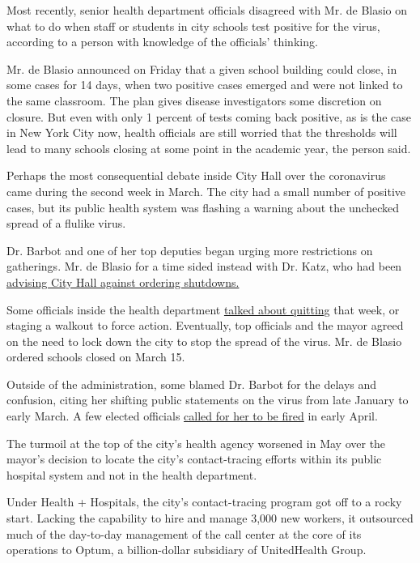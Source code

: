 Most recently, senior health department officials disagreed with Mr. de
Blasio on what to do when staff or students in city schools test
positive for the virus, according to a person with knowledge of the
officials' thinking.

Mr. de Blasio announced on Friday that a given school building could
close, in some cases for 14 days, when two positive cases emerged and
were not linked to the same classroom. The plan gives disease
investigators some discretion on closure. But even with only 1 percent
of tests coming back positive, as is the case in New York City now,
health officials are still worried that the thresholds will lead to many
schools closing at some point in the academic year, the person said.

Perhaps the most consequential debate inside City Hall over the
coronavirus came during the second week in March. The city had a small
number of positive cases, but its public health system was flashing a
warning about the unchecked spread of a flulike virus.

Dr. Barbot and one of her top deputies began urging more restrictions on
gatherings. Mr. de Blasio for a time sided instead with Dr. Katz, who
had been
\href{https://www.nytimes.com/2020/05/14/nyregion/coronavirus-de-blasio-mitchell-katz.html}{advising
City Hall against ordering shutdowns.}

Some officials inside the health department
\href{https://www.nytimes.com/2020/03/16/nyregion/coronavirus-bill-de-blasio.html}{talked
about quitting} that week, or staging a walkout to force action.
Eventually, top officials and the mayor agreed on the need to lock down
the city to stop the spread of the virus. Mr. de Blasio ordered schools
closed on March 15.

Outside of the administration, some blamed Dr. Barbot for the delays and
confusion, citing her shifting public statements on the virus from late
January to early March. A few elected officials
\href{https://nypost.com/2020/04/04/nyc-pols-urge-de-blasio-to-oust-health-commissioner-over-coronavirus-response/}{called
for her to be fired} in early April.

The turmoil at the top of the city's health agency worsened in May over
the mayor's decision to locate the city's contact-tracing efforts within
its public hospital system and not in the health department.

Under Health + Hospitals, the city's contact-tracing program got off to
a rocky start. Lacking the capability to hire and manage 3,000 new
workers, it outsourced much of the day-to-day management of the call
center at the core of its operations to Optum, a billion-dollar
subsidiary of UnitedHealth Group.

